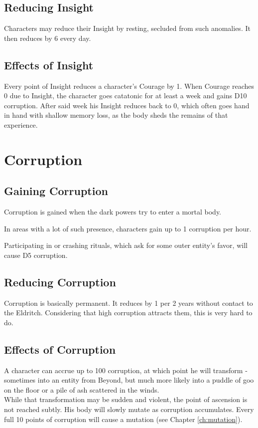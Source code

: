 \documentclass[11pt,a4paper,openany]{book}
\begin{document}
	\subsection{Reducing Insight}
	Characters may reduce their Insight by resting,
		secluded from such anomalies.
	It then reduces by 6 every day.
	\subsection{Effects of Insight}
	Every point of Insight reduces a character's Courage by 1.
	When Courage reaches 0 due to Insight,
		the character goes catatonic for at least a week and gains D10 corruption.
	After said week his Insight reduces back to 0,
		which often goes hand in hand with shallow memory loss,
		as the body sheds the remains of that experience.
	
	\section{Corruption}
	\subsection{Gaining Corruption}
	Corruption is gained when the dark powers try to enter a mortal body.
	\begin{sitemize}[8]
		\item In areas with a lot of such presence, characters gain up to 1 corruption per hour.
		\item Participating in or crashing rituals, which ask for some outer entity's favor, will cause D5 corruption.
	\end{sitemize}
	\subsection{Reducing Corruption}
	Corruption is basically permanent.
	It reduces by 1 per 2 years without contact to the Eldritch.
	Considering that high corruption attracts them, this is very hard to do.
	\subsection{Effects of Corruption}
	A character can accrue up to 100 corruption, at which point he will transform
		- sometimes into an entity from Beyond,
		but much more likely into
		a puddle of goo on the floor
		or a pile of ash scattered in the winds.
		\\%
	While that transformation may be sudden and violent,
		the point of ascension is not reached subtly.
	His body will slowly mutate as corruption accumulates.
	Every full 10 points of corruption will cause a mutation (see Chapter \ref{ch:mutation}).
	
\end{document}
